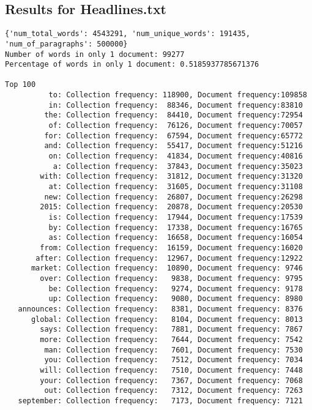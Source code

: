 \documentclass{article}
\begin{document}
\subsection{Results for Headlines.txt}
\begin{verbatim}
{'num_total_words': 4543291, 'num_unique_words': 191435,
'num_of_paragraphs': 500000}
Number of words in only 1 document: 99277
Percentage of words in only 1 document: 0.5185937785671376

Top 100
          to: Collection frequency: 118900, Document frequency:109858
          in: Collection frequency:  88346, Document frequency:83810
         the: Collection frequency:  84410, Document frequency:72954
          of: Collection frequency:  76126, Document frequency:70057
         for: Collection frequency:  67594, Document frequency:65772
         and: Collection frequency:  55417, Document frequency:51216
          on: Collection frequency:  41834, Document frequency:40816
           a: Collection frequency:  37843, Document frequency:35023
        with: Collection frequency:  31812, Document frequency:31320
          at: Collection frequency:  31605, Document frequency:31108
         new: Collection frequency:  26807, Document frequency:26298
        2015: Collection frequency:  20878, Document frequency:20530
          is: Collection frequency:  17944, Document frequency:17539
          by: Collection frequency:  17338, Document frequency:16765
          as: Collection frequency:  16658, Document frequency:16054
        from: Collection frequency:  16159, Document frequency:16020
       after: Collection frequency:  12967, Document frequency:12922
      market: Collection frequency:  10890, Document frequency: 9746
        over: Collection frequency:   9838, Document frequency: 9795
          be: Collection frequency:   9274, Document frequency: 9178
          up: Collection frequency:   9080, Document frequency: 8980
   announces: Collection frequency:   8381, Document frequency: 8376
      global: Collection frequency:   8104, Document frequency: 8013
        says: Collection frequency:   7881, Document frequency: 7867
        more: Collection frequency:   7644, Document frequency: 7542
         man: Collection frequency:   7601, Document frequency: 7530
         you: Collection frequency:   7512, Document frequency: 7034
        will: Collection frequency:   7510, Document frequency: 7448
        your: Collection frequency:   7367, Document frequency: 7068
         out: Collection frequency:   7312, Document frequency: 7263
   september: Collection frequency:   7173, Document frequency: 7121

\end{verbatim}
\end{document}
